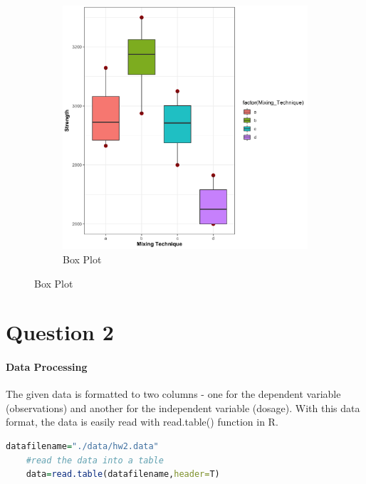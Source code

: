 \documentclass[11pt]{article}
\begin{document}
\begin{figure}[H]
\begin{subfigure}{0.45\textwidth}
        \includegraphics[width=\textwidth]{../pictures/hw2_q1_box.png}
        \caption{Box Plot}
    \end{subfigure}
\end{figure}

\clearpage
\section{Question 2}

\paragraph{Data Processing}
The given data is formatted to two columns - one for the dependent variable (observations) and another for the independent variable (dosage). With this data format, the data is easily read with read.table() function in R.

\begin{lstlisting}[language=R]
    datafilename="./data/hw2.data"
    #read the data into a table
    data=read.table(datafilename,header=T)
\end{lstlisting}
\end{document}
